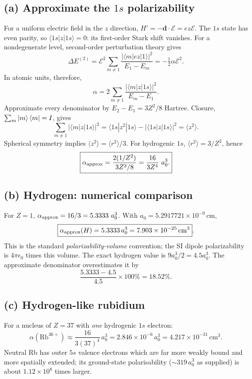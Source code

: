 \subsection*{(a) Approximate the \(1s\) polarizability}
For a uniform electric field in the \(z\) direction,
\(H'=-\mathbf d\cdot\boldsymbol{\mathcal E}
=e z\mathcal E\). The \(1s\) state has even
parity, so \(\langle1s|z|1s\rangle=0\):
its first-order Stark shift vanishes.
For a nondegenerate level, second-order
perturbation theory gives
\[
\Delta E^{(2)}=\mathcal E^2
\sum_{m\ne1}\frac{|\langle m|ez|1\rangle|^2}{E_1-E_m}
=-\tfrac12\alpha\mathcal E^2.
\]
In atomic units, therefore,
\[
\alpha=2\sum_{m\ne1}
\frac{|\langle m|z|1s\rangle|^2}{E_m-E_1}.
\]
Approximate every denominator by
\(E_2-E_1=3Z^2/8\) Hartree.
Closure, \(\sum_m\left\lvert m\right\rangle\left\langle m\right\rvert=I\), gives
\[
\sum_{m\ne1}|\langle m|z|1s\rangle|^2
=\langle1s|z^2|1s\rangle
-|\langle1s|z|1s\rangle|^2
=\langle z^2\rangle.
\]
Spherical symmetry implies
\(\langle z^2\rangle=\langle r^2\rangle/3\).
For hydrogenic \(1s\),
\(\langle r^2\rangle=3/Z^2\), hence
\[
\boxed{\alpha_{\rm approx}=
\frac{2(1/Z^2)}{3Z^2/8}
=\frac{16}{3Z^4}\ a_0^3.}
\]

\subsection*{(b) Hydrogen: numerical comparison}
For \(Z=1\), \(\alpha_{\rm approx}=16/3=5.3333\ a_0^3\).
With \(a_0=5.2917721\times10^{-9}\,\mathrm{cm}\),
\[
\boxed{\alpha_{\rm approx}(H)
=5.3333\,a_0^3
=7.903\times10^{-25}\,\mathrm{cm}^3}.
\]
This is the standard \emph{polarizability-volume}
convention; the SI dipole polarizability is
\(4\pi\epsilon_0\) times this volume.
The exact hydrogen value is \(9a_0^3/2=4.5a_0^3\).
The approximate denominator overestimates it by
\[
\boxed{\frac{5.3333-4.5}{4.5}\times100\%
=18.52\%.}
\]

\subsection*{(c) Hydrogen-like rubidium}
For a nucleus of \(Z=37\) with \emph{one}
hydrogenic \(1s\) electron:
\[
\boxed{\alpha(\mathrm{Rb}^{36+})\approx
\frac{16}{3(37)^4}\,a_0^3
=2.846\times10^{-6}\,a_0^3
=4.217\times10^{-31}\,\mathrm{cm}^3}.
\]
Neutral Rb has outer \(5s\) valence electrons
which are far more weakly bound and more
spatially extended; its ground-state
polarisability (\(\sim319\,a_0^3\) as supplied)
is about \(1.12\times10^8\) times larger.
